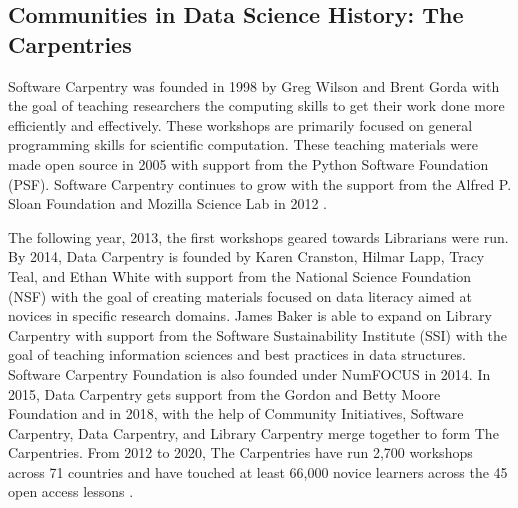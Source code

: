 \documentclass[010-intro.tex]{subfiles}
\begin{document}
    \subsection{Communities in Data Science History: The Carpentries}

        Software Carpentry was founded in 1998 by Greg Wilson and Brent Gorda with the goal of
        teaching researchers the computing skills to get their work done more efficiently and effectively.
        These workshops are primarily focused on general programming skills for scientific computation.
        These teaching materials were made open source in 2005 with support from the Python Software Foundation (PSF).
        Software Carpentry continues to grow with the support from the Alfred P. Sloan Foundation and Mozilla Science Lab in 2012
        \cite{CarpentriesHowWe, jordanCarpentries2020Annual}.


        The following year, 2013, the first workshops geared towards Librarians were run.
        By 2014, Data Carpentry is founded by Karen Cranston, Hilmar Lapp, Tracy Teal, and Ethan White
        with support from the National Science Foundation (NSF)
        with the goal of creating materials focused on data literacy aimed at novices in specific research domains.
        James Baker is able to expand on Library Carpentry with support from the Software Sustainability Institute (SSI)
        with the goal of teaching information sciences and best practices in data structures.
        Software Carpentry Foundation is also founded under NumFOCUS in 2014.
        In 2015, Data Carpentry gets support from the Gordon and Betty Moore Foundation and
        in 2018, with the help of Community Initiatives, Software Carpentry, Data Carpentry, and Library Carpentry
        merge together to form The Carpentries.
        From 2012 to 2020, The Carpentries have run
        2,700 workshops across 71 countries and have touched at least 66,000 novice learners
        across the 45 open access lessons
        \cite{CarpentriesHowWe, jordanCarpentries2020Annual}.
\end{document}
